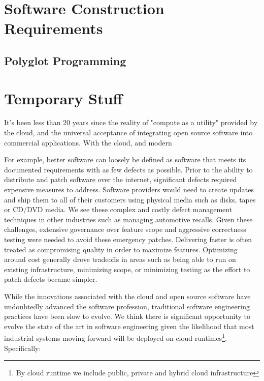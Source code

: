 \documentclass[conference]{IEEEconf}
\begin{document}
\section{Software Construction Requirements}
\label{sec:SoftwareConstruction}

\subsection{Polyglot Programming}
\label{subsec:Polyglot}

\section{Temporary Stuff}
It's been less than 20 years since the reality of "compute as a utility" provided by the cloud, and the universal acceptance of integrating open source software into commercial applications. With the cloud, and modern 

For example, better software can loosely be defined as software that meets its documented requirements with as few defects as possible.  Prior to the ability to distribute and patch software over the internet, significant defects required expensive measures to address.  Software providers would need to create updates and ship them to all of their customers using physical media such as disks, tapes or CD/DVD media.  We see these complex and costly defect management techniques in other industries such as managing automotive recalls. Given these challenges, extensive governance over feature scope and aggressive correctness testing were needed to avoid these emergency patches.  Delivering faster is often treated as compromising quality in order to maximize features. Optimizing around cost generally drove tradeoffs in areas such as being able to run on existing infrastructure, minimizing scope, or minimizing testing as the effort to patch defects became simpler. 

While the innovations associated with the cloud and open source software have undoubtedly advanced the software profession, traditional software engineering practices have been slow to evolve.  We think there is significant opportunity to evolve the state of the art in software engineering given the likelihood that most industrial systems moving forward will be deployed on cloud runtimes\footnote{By cloud runtime we include public, private and hybrid cloud infrastructure}. Specifically:
\end{document}
